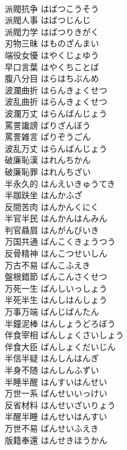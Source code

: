 \documentclass[8pt]{extreport}
\begin{document}
\begin{CJK}{UTF8}{min}
\\	派閥抗争	はばつこうそう	
\\	派閥人事	はばつじんじ	
\\	派閥力学	はばつりきがく	
\\	刃物三昧	はものざんまい	
\\	端役女優	はやくじょゆう	
\\	早口言葉	はやくちことば	
\\	腹八分目	はらはちぶんめ	
\\	波瀾曲折	はらんきょくせつ	
\\	波乱曲折	はらんきょくせつ	
\\	波瀾万丈	はらんばんじょう	
\\	罵詈讒謗	ばりざんぼう	
\\	罵詈雑言	ばりぞうごん	
\\	波乱万丈	はらんばんじょう	
\\	破廉恥漢	はれんちかん	
\\	破廉恥罪	はれんちざい	
\\	半永久的	はんえいきゅうてき	
\\	半跏趺坐	はんかふざ	
\\	反間苦肉	はんかんくにく	
\\	半官半民	はんかんはんみん	
\\	判官贔屓	はんがんびいき	
\\	万国共通	ばんこくきょうつう	
\\	反骨精神	はんこつせいしん	
\\	万古不易	ばんこふえき	
\\	盤根錯節	ばんこんさくせつ	
\\	万死一生	ばんしいっしょう	
\\	半死半生	はんしはんしょう	
\\	万事万端	ばんじばんたん	
\\	半鐘泥棒	はんしょうどろぼう	
\\	伴食宰相	ばんしょくさいしょう	
\\	伴食大臣	ばんしょくだいじん	
\\	半信半疑	はんしんはんぎ	
\\	半身不随	はんしんふずい	
\\	半睡半醒	はんすいはんせい	
\\	万世一系	ばんせいいっけい	
\\	反省材料	はんせいざいりょう	
\\	半醒半睡	はんせいはんすい	
\\	万世不易	ばんせいふえき	
\\	版籍奉還	はんせきほうかん	

\end{CJK}
\end{document}
